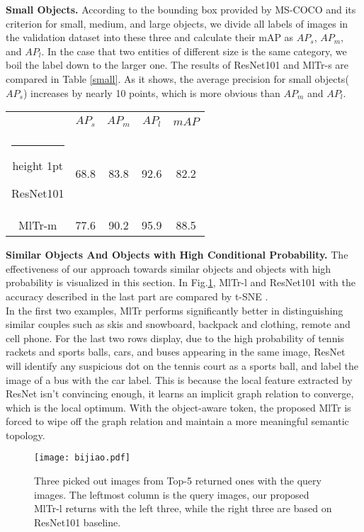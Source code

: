 \documentclass{article} \usepackage[numbers,sort&compress]{natbib}
\makeatletter
\newcommand{\thickhline}{\noalign {\ifnum 0=`}\fi \hrule height 1pt
    \futurelet \reserved@a \@xhline
}
\makeatother
\begin{document}
\textbf{Small Objects.}
According to the bounding box provided by MS-COCO and its criterion for small, medium, and large objects, we divide all labels of images in the validation dataset into these three and calculate their mAP as $AP_s$, $AP_m$, and $AP_l$. In the case that two entities of different size is the same category, we boil the label down to the larger one. The results of ResNet101 and MlTr-s are compared in Table \ref{small}. As it shows, the average precision for small objects($AP_s$) increases by nearly 10 points, which is more obvious than $AP_m$ and $AP_l$.

\begin{table*}[h]
\centering
\caption{The comparisons in three different size objects.}
\label{small}
\begin{tabular}{|c|c|c|c|c|}
\hline
\  & $AP_s$ & $AP_m$ & $AP_l$ & $mAP$ \\
\thickhline
ResNet101 \cite{he2016deep} &68.8 &83.8 &92.6 &82.2 \\
\hline
MlTr-m &77.6 &90.2 &95.9  &88.5\\
\hline
\end{tabular}
\end{table*}

\textbf{Similar Objects And Objects with High Conditional Probability.}
The effectiveness of our approach towards similar objects and objects with high probability is visualized in this section. In Fig.\ref{bijiao}, MlTr-l and ResNet101 with the accuracy described in the last part are compared by t-SNE \cite{van2008visualizing}.\\
In the first two examples, MlTr performs significantly better in distinguishing similar couples such as skis and snowboard, backpack and clothing, remote and cell phone. For the last two rows display, due to the high probability of tennis rackets and sports balls, cars, and buses appearing in the same image, ResNet will identify any suspicious dot on the tennis court as a sports ball, and label the image 
of a bus with the car label. This is because the local feature extracted by ResNet isn't convincing enough, it learns an implicit graph relation to converge, which is the local optimum. With the object-aware token, the proposed MlTr is forced to wipe off the graph relation and maintain a more meaningful semantic topology.



\begin{figure}[h]
\begin{center}
\texttt{[image: bijiao.pdf]}
\caption{Three picked out images from Top-5 returned ones with the query images. The leftmost column is the query images, our proposed MlTr-l returns with the left three, while the right three are based on ResNet101 baseline.}
\label{bijiao}
\end{center}
\end{figure}
\end{document}
